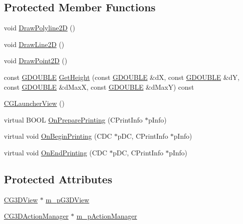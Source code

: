 \subsection*{Protected Member Functions}
\begin{DoxyCompactItemize}
\item 
void \hyperlink{class_c_g_launcher_view_aa65d47769108941fd2ecad29ec499631}{Draw\+Polyline2\+D} ()
\item 
void \hyperlink{class_c_g_launcher_view_adea9cfac67b5aecc21d834301e4a8403}{Draw\+Line2\+D} ()
\item 
void \hyperlink{class_c_g_launcher_view_ac22cc4f52178d1b2bcb68627b9a6626d}{Draw\+Point2\+D} ()
\item 
const \hyperlink{_g_types_8h_afd05ac85f90ee8e2a733928545462cd4}{G\+D\+O\+U\+B\+L\+E} \hyperlink{class_c_g_launcher_view_aedc91b1e0279300b33021b784879f7a1}{Get\+Height} (const \hyperlink{_g_types_8h_afd05ac85f90ee8e2a733928545462cd4}{G\+D\+O\+U\+B\+L\+E} \&d\+X, const \hyperlink{_g_types_8h_afd05ac85f90ee8e2a733928545462cd4}{G\+D\+O\+U\+B\+L\+E} \&d\+Y, const \hyperlink{_g_types_8h_afd05ac85f90ee8e2a733928545462cd4}{G\+D\+O\+U\+B\+L\+E} \&d\+Max\+X, const \hyperlink{_g_types_8h_afd05ac85f90ee8e2a733928545462cd4}{G\+D\+O\+U\+B\+L\+E} \&d\+Max\+Y) const 
\item 
\hyperlink{class_c_g_launcher_view_abf6e9b2079dce7dc3287b8679d8edb96}{C\+G\+Launcher\+View} ()
\item 
virtual B\+O\+O\+L \hyperlink{class_c_g_launcher_view_a42b692aad72d8dc206bd84408c08c699}{On\+Prepare\+Printing} (C\+Print\+Info $\ast$p\+Info)
\item 
virtual void \hyperlink{class_c_g_launcher_view_abe37990582632e56e009da5dd827c16c}{On\+Begin\+Printing} (C\+D\+C $\ast$p\+D\+C, C\+Print\+Info $\ast$p\+Info)
\item 
virtual void \hyperlink{class_c_g_launcher_view_a9813c7717721f9f06c6971a0344ec4ba}{On\+End\+Printing} (C\+D\+C $\ast$p\+D\+C, C\+Print\+Info $\ast$p\+Info)
\end{DoxyCompactItemize}
\subsection*{Protected Attributes}
\begin{DoxyCompactItemize}
\item 
\hyperlink{class_c_g3_d_view}{C\+G3\+D\+View} $\ast$ \hyperlink{class_c_g_launcher_view_ab8b03252d6cd3ee373ab2719f53978a1}{m\+\_\+p\+G3\+D\+View}
\item 
\hyperlink{class_c_g3_d_action_manager}{C\+G3\+D\+Action\+Manager} $\ast$ \hyperlink{class_c_g_launcher_view_a7094207897d480dffe7a8799e271e977}{m\+\_\+p\+Action\+Manager}
\end{DoxyCompactItemize}


